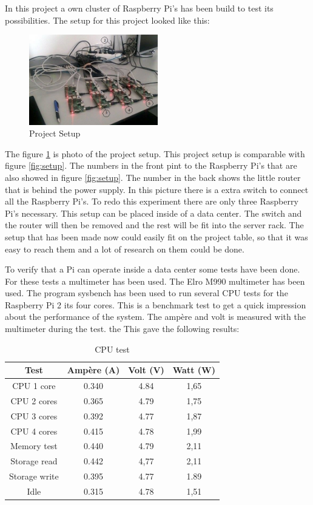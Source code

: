 \documentclass{sig-alternate-br}
\begin{document}
In this project a own cluster of Raspberry Pi's has been build to test its possibilities. The setup for this project looked like this:
\begin{figure}[H]
	\centering 
	\includegraphics[width=0.50\textwidth]{setup.jpg}
	\caption{Project Setup}
	\label{fig:projectsetup} %
\end{figure}
The figure \ref{fig:projectsetup} is photo of the project setup. This project setup is comparable with figure \ref{fig:setup}. The numbers in the front pint to the Raspberry Pi's that are also showed in figure \ref{fig:setup}. The number in the back shows the little router that is behind the power supply. In this picture there is a extra switch to connect all the Raspberry Pi's. To redo this experiment there are only three Raspberry Pi's necessary. \newline 
This setup can be placed inside of a data center. The switch and the router will then be removed and the rest will be fit into the server rack. The setup that has been made now could easily fit on the project table, so that it was easy to reach them and a lot of research on them could be done. 

To verify that a Pi can operate inside a data center some tests have been done. For these tests a multimeter has been used. The Elro M990 multimeter has been used. The program sysbench has been used to run several CPU tests for the Raspberry Pi 2 its four cores. This is a benchmark test to get a quick impression about the performance of the system. The ampère and volt is measured with the multimeter during the test. the This gave the following results:
\begin{table}[H]
	\centering \caption{CPU test}
	\begin{tabular}{|c|c|c|c|} \hline
		Test & Ampère (A) & Volt (V) & Watt (W)\\ \hline
		CPU 1 core & 0.340 & 4.84  & 1,65\\ \hline
		CPU 2 cores & 0.365 & 4.79 & 1,75\\ \hline
		CPU 3 cores & 0.392 & 4.77 & 1,87 \\ \hline
		CPU 4 cores & 0.415 & 4.78 & 1,99 \\ \hline
		Memory test & 0.440 & 4.79 & 2,11 \\ \hline
		Storage read & 0.442 & 4,77 & 2,11\\ \hline
		Storage write & 0.395 & 4.77 & 1.89 \\ \hline
		Idle & 0.315 & 4.78 & 1,51 \\ \hline
	\end{tabular}
	\label{tab:cpu}
\end{table}
\end{document}
